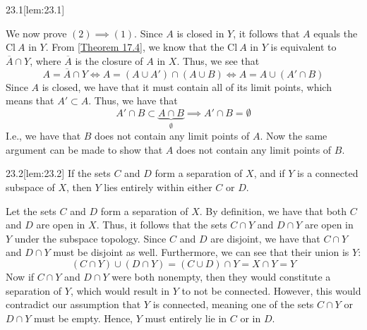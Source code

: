 \begin{thmBox}[Lemma]{23.1}[lem:23.1]
\begin{proofBox}
        \baseSkip

        We now prove \( ( 2 ) \implies ( 1 ) \).
        Since \( A \) is closed in \( Y \), it follows that \( A \) equals the
        \( \mathrm{Cl} \ A \) in \( Y \).
        From [\hyperlink{thm:17.4}{Theorem 17.4}], we know that the 
        \( \mathrm{Cl} \ A \) in \( Y \) is equivalent to 
        \( \overline{ A } \cap Y \), where \( \overline{ A } \) is the closure 
        of \( A \) in \( X \).
        Thus, we see that 
        \begin{equation*}
            A = \overline{ A } \cap Y
            \iff 
            A = ( A \cup A' ) \cap ( A \cup B )
            \iff 
            A = A \cup ( A' \cap B )
        \end{equation*}
        Since \( A \) is closed, we have that it must contain all of its limit
        points, which means that \( A' \subset A \).
        Thus, we have that 
        \begin{equation*}
            A' \cap B \subset \underbrace{ A \cap B }_{ \emptyset }
            \implies 
            A' \cap B = \emptyset
        \end{equation*}
        I.e., we have that \( B \) does not contain any limit points of \( A \).
        Now the same argument can be made to show that \( A \) does not contain
        any limit points of \( B \).
    \end{proofBox}
\end{thmBox}

\begin{thmBox}[Lemma]{23.2}[lem:23.2]
    If the sets \( C \) and \( D \) form a separation of \( X \), and if 
    \( Y \) is a connected subspace of \( X \), then \( Y \) lies entirely 
    within either \( C \) or \( D \).

    \baseRule

    \begin{proofBox}
        Let the sets \( C \) and \( D \) form a separation of \( X \).
        By definition, we have that both \( C \) and \( D \) 
        are open in \( X \).
        Thus, it follows that the sets \( C \cap Y \) and \( D \cap Y \) are 
        open in \( Y \) under the subspace topology.
        Since \( C \) and \( D \) are disjoint, we have that 
        \( C \cap Y \) and \( D \cap Y \) must be disjoint as well.
        Furthermore, we can see that their union is \( Y \):
        \begin{equation*}
            ( C \cap Y ) \cup ( D \cap Y )
            =
            ( C \cup D ) \cap Y
            =
            X \cap Y
            =
            Y
        \end{equation*}
        Now if \( C \cap Y \) and \( D \cap Y \) were both nonempty, then
        they would constitute a separation of \( Y \), which would result in
        \( Y \) to not be connected.
        However, this would contradict our assumption that \( Y \) is connected,
        meaning one of the sets \( C \cap Y \) or \( D \cap Y \) must be empty.
        Hence, \( Y \) must entirely lie in \( C \) or in \( D \).
    \end{proofBox}
\end{thmBox}

